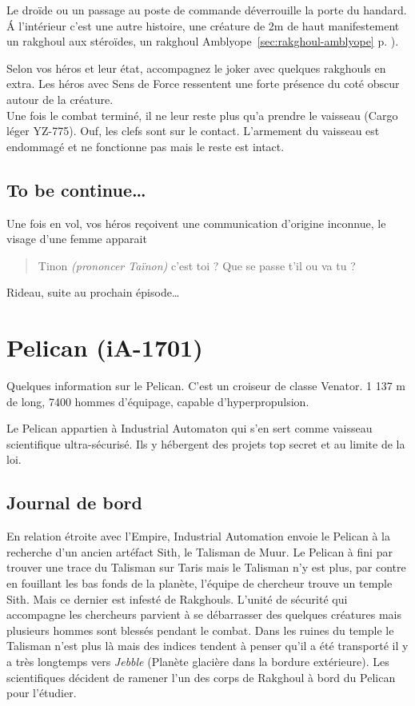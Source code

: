 \documentclass{jdrp}
\begin{document}
Le droïde ou un passage au poste de commande déverrouille la porte du handard. \'A l'intérieur c'est une autre histoire, une créature de 2m de haut manifestement un rakghoul aux stéroïdes, un rakghoul Amblyope~\ref{sec:rakghoul-amblyope} p. \pageref{sec:rakghoul-amblyope}).

Selon vos héros et leur état, accompagnez le joker avec quelques rakghouls en extra. Les héros avec Sens de Force ressentent une forte présence du coté obscur autour de la créature.\\

Une fois le combat terminé, il ne leur reste plus qu'a prendre le vaisseau (Cargo léger YZ-775). Ouf, les clefs sont sur le contact. L'armement du vaisseau est endommagé et ne fonctionne pas mais le reste est intact.

\subsection{To be continue\ldots}
Une fois en vol, vos héros reçoivent une communication d'origine inconnue, le visage d'une femme apparait

\begin{quote}
	Tinon \emph{(prononcer Taïnon)} c'est toi ? Que se passe t'il ou va tu ?
\end{quote}

Rideau, suite au prochain épisode\ldots


\clearpage
\section{Pelican (iA-1701)}

Quelques information sur le Pelican. C'est un croiseur de classe Venator. 1 137 m de long, 7400 hommes d'équipage, capable d'hyperpropulsion.

Le Pelican appartien à Industrial Automaton qui s'en sert comme vaisseau scientifique ultra-sécurisé. Ils y hébergent des projets top secret et au limite de la loi.

\subsection{Journal de bord}
\label{sec:pelican-jdb}
En relation étroite avec l'Empire, Industrial Automation envoie le Pelican à la recherche d'un ancien artéfact Sith, le Talisman de Muur. Le Pelican à fini par trouver une trace du Talisman sur Taris mais le Talisman n'y est plus, par contre en fouillant les bas fonds de la planète, l'équipe de chercheur trouve un temple Sith. Mais ce dernier est infesté de Rakghouls. L'unité de sécurité qui accompagne les chercheurs parvient à se débarrasser des quelques créatures mais plusieurs hommes sont blessés pendant le combat. Dans les ruines du temple le Talisman n'est plus là mais des indices tendent à penser qu'il a été transporté il y a très longtemps vers \emph{Jebble} (Planète glacière dans la bordure extérieure). Les scientifiques décident de ramener l'un des corps de Rakghoul à bord du Pelican pour l'étudier.
\end{document}
